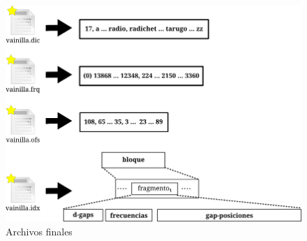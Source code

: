 \begin{figure}[!ht]
\centering
    \includegraphics[scale=0.8]{./Images/indice2_2.png}
\caption{Archivos finales}
\label{fig:indice2_2}
\end{figure}







